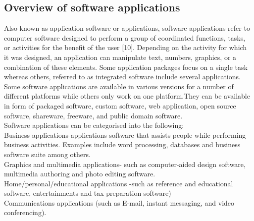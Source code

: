 \documentclass[a4paper]{article}
\begin{document}
\subsection{Overview of software applications}
Also known as application software or applications, software applications refer to computer software designed to perform a group of coordinated functions, tasks, or activities for the benefit of the user [10]. Depending on the activity for which it was designed, an application can manipulate text, numbers, graphics, or a combination of these elements. Some application packages focus on a single task whereas others, referred to as integrated software include several applications. Some software applications are available in various versions for a number of different platforms while others only work on one platform.They can be available in form of packaged software, custom software, web application, open source software, shareware, freeware, and public domain software. \\
Software applications can be categorised into the following:\\ Business applications-applications software that assists people while performing business activities. Examples include word processing, databases and business software suite among others.\\
Graphics and multimedia applications- such as computer-aided design software, multimedia authoring and photo editing software.\\
Home/personal/educational applications -such as reference and educational software, entertainments and tax preparation software)\\
Communications applications (such as E-mail, instant messaging, and video conferencing).  
\end{document}
